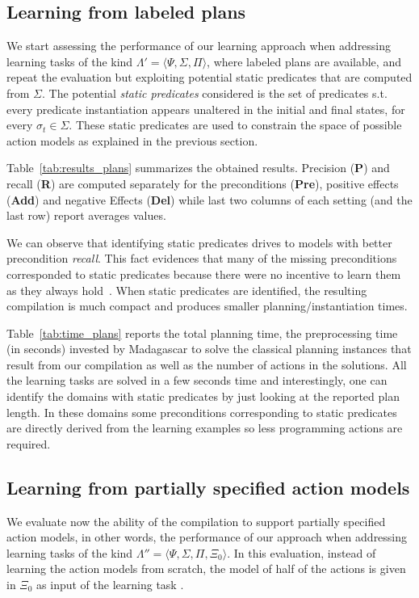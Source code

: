 \documentclass[letterpaper]{article} %
\newcommand{\tup}[1]{{\langle #1 \rangle}}
\begin{document}
\subsection{Learning from labeled plans}
We start assessing the performance of our learning approach when addressing learning tasks of the kind $\Lambda'=\tup{\Psi,\Sigma,\Pi}$, where labeled plans are available, and repeat the evaluation but exploiting potential static predicates that are computed from $\Sigma$. The potential {\em static predicates} considered is the set of predicates s.t. every predicate instantiation appears unaltered in the initial and final states, for every $\sigma_t\in\Sigma$. These static predicates are used to constrain the space of possible action models as explained in the previous section.

Table~\ref{tab:results_plans} summarizes the obtained results. Precision ({\bf P}) and recall ({\bf R}) are computed separately for the preconditions ({\bf Pre}), positive effects ({\bf Add}) and negative Effects ({\bf Del}) while last two columns of each setting (and the last row) report averages values. 

We can observe that identifying static predicates drives to models with better precondition {\em recall}. This fact evidences that many of the missing preconditions corresponded to static predicates because there were no incentive to learn them as they always hold~\cite{gregory2015domain}. When static predicates are identified, the resulting compilation is much compact and produces smaller planning/instantiation times. 

Table~\ref{tab:time_plans} reports the total planning time, the preprocessing time (in seconds) invested by {\sc Madagascar} to solve the classical planning instances that result from our compilation as well as the number of actions in the solutions. All the learning tasks are solved in a few seconds time and interestingly, one can identify the domains with static predicates by just looking at the reported plan length. In these domains some preconditions corresponding to static predicates are directly derived from the learning examples so less programming actions are required.

\subsection{Learning from partially specified action models}

We evaluate now the ability of the compilation to support partially specified action models, in other words, the performance of our approach when addressing learning tasks of the kind $\Lambda''=\tup{\Psi,\Sigma,\Pi,\Xi_0}$. In this evaluation, instead of learning the action models from scratch, the model of half of the actions is given in $\Xi_0$ as input of the learning task .
\end{document}

